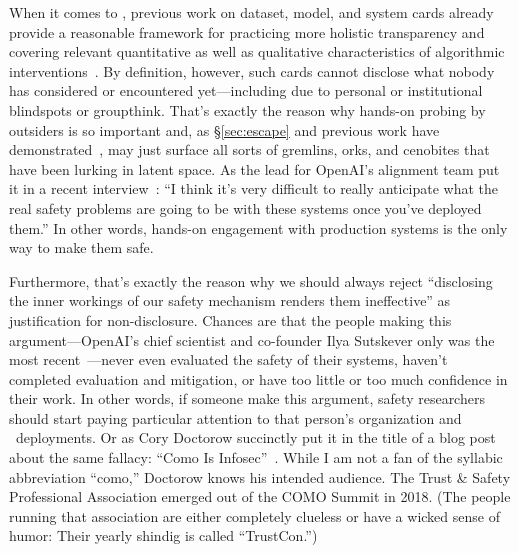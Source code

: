 When it comes to \AI, previous work on dataset, model, and system cards already
provide a reasonable framework for practicing more holistic transparency and
covering relevant quantitative as well as qualitative characteristics of
algorithmic
interventions~\cite{GebruMorgensternea2021,MitchellWuea2019,ProcopeCheemaea2022}.
By definition, however, such cards cannot disclose what nobody has considered or
encountered yet---including due to personal or institutional blindspots or
groupthink. That's exactly the reason why hands-on probing by outsiders is so
important and, as \S\ref{sec:escape} and previous work have
demonstrated~\cite{BirhanePrabhuea2021,CarliniHayesea2023}, may just surface all
sorts of gremlins, orks, and cenobites that have been lurking in latent space.
As the lead for OpenAI's alignment team put it in a recent
interview~\cite{Heaven2023}: ``I think it's very difficult to really anticipate
what the real safety problems are going to be with these systems once you've
deployed them.'' In other words, hands-on engagement with production systems is
the only way to make them safe.

Furthermore, that's exactly the reason why we should always reject ``disclosing
the inner workings of our safety mechanism renders them ineffective'' as
justification for non-disclosure. Chances are that the people making this
argument---OpenAI's chief scientist and co-founder Ilya Sutskever only was the
most recent~\cite{Vincent2023a}---never even evaluated the safety of their
systems, haven't completed evaluation and mitigation, or have too little or too
much confidence in their work. In other words, if someone make this argument,
safety researchers should start paying particular attention to that person's
organization and \AI\ deployments. Or as Cory Doctorow succinctly put it in the
title of a blog post about the same fallacy: ``Como Is
Infosec''~\cite{Doctorow2022}. While I am not a fan of the syllabic abbreviation
``como,'' Doctorow knows his intended audience. The Trust \& Safety Professional
Association emerged out of the COMO Summit in 2018. (The people running that
association are either completely clueless or have a wicked sense of humor:
Their yearly shindig is called ``TrustCon.'')

